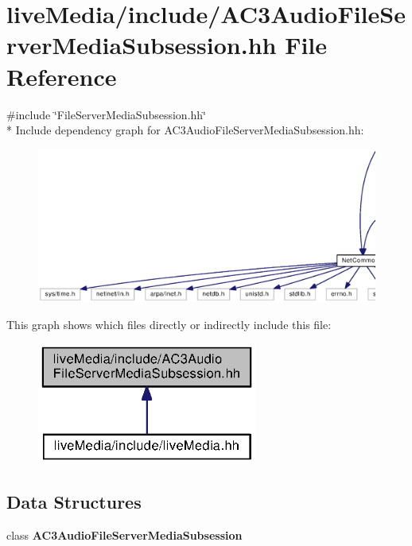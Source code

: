 \section{live\+Media/include/\+A\+C3\+Audio\+File\+Server\+Media\+Subsession.hh File Reference}
\label{AC3AudioFileServerMediaSubsession_8hh}
{\ttfamily \#include \char`\"{}File\+Server\+Media\+Subsession.\+hh\char`\"{}}\\*
Include dependency graph for A\+C3\+Audio\+File\+Server\+Media\+Subsession.\+hh\+:
\nopagebreak
\begin{figure}[H]
\begin{center}
\leavevmode
\includegraphics[width=350pt]{AC3AudioFileServerMediaSubsession_8hh__incl}
\end{center}
\end{figure}
This graph shows which files directly or indirectly include this file\+:
\nopagebreak
\begin{figure}[H]
\begin{center}
\leavevmode
\includegraphics[width=205pt]{AC3AudioFileServerMediaSubsession_8hh__dep__incl}
\end{center}
\end{figure}
\subsection*{Data Structures}
\begin{DoxyCompactItemize}
\item 
class {\bf A\+C3\+Audio\+File\+Server\+Media\+Subsession}
\end{DoxyCompactItemize}
